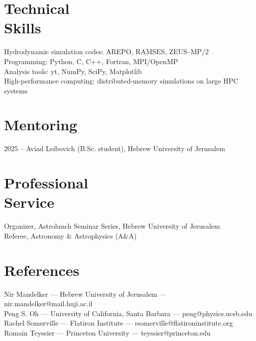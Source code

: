 \documentclass[margin, 10pt]{res} %
\begin{document}
\begin{resume}
\section{Technical \\ Skills}

Hydrodynamic simulation codes: AREPO, RAMSES, ZEUS--MP/2\\
Programming: Python, C, C++, Fortran, MPI/OpenMP\\
Analysis tools: yt, NumPy, SciPy, Matplotlib\\
High-performance computing: distributed-memory simulations on large HPC systems

\section{Mentoring}

2025 -- Aviad Leibovich (B.Sc. student), Hebrew University of Jerusalem

\section{Professional \\ Service}

Organizer, Astrolunch Seminar Series, Hebrew University of Jerusalem\\
Referee, Astronomy \& Astrophysics (A\&A)

\section{References}

Nir Mandelker --- Hebrew University of Jerusalem --- nir.mandelker@mail.huji.ac.il\\[2pt]
Peng S. Oh --- University of California, Santa Barbara --- peng@physics.ucsb.edu\\[2pt]
Rachel Somerville --- Flatiron Institute --- rsomerville@flatironinstitute.org\\[2pt]
Romain Teyssier --- Princeton University --- teyssier@princeton.edu

\end{resume}
\end{document}
